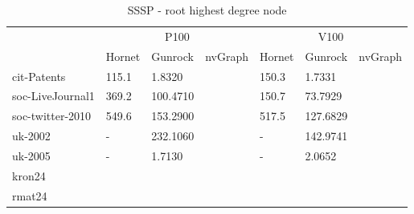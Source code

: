\begin{table}[t]
\begin{center}
\caption{SSSP - root highest degree node}
\begin{tabular}{l|l|l|l|l|l|l|}
\cline{2-7}
                                          & \multicolumn{3}{c|}{P100}  & \multicolumn{3}{c|}{V100}  \\ \cline{2-7} 
                                          & Hornet & Gunrock & nvGraph & Hornet & Gunrock & nvGraph \\ \hline
\multicolumn{1}{|l|}{cit-Patents}         &115.1&1.8320&         &150.3&1.7331&         \\ \hline %
\multicolumn{1}{|l|}{soc-LiveJournal1}    &369.2&100.4710&         &150.7&73.7929&         \\ \hline %
\multicolumn{1}{|l|}{soc-twitter-2010}    &549.6&153.2900&         &517.5&127.6829&         \\ \hline %
\multicolumn{1}{|l|}{uk-2002}             &-        &232.1060&         &-        &142.9741&         \\ \hline %
\multicolumn{1}{|l|}{uk-2005}             &-        &1.7130&         &-        &2.0652&         \\ \hline %
\multicolumn{1}{|l|}{kron24}              &        &         &         &        &         &         \\ \hline %
\multicolumn{1}{|l|}{rmat24}              &        &         &         &        &         &         \\ \hline %
\end{tabular}

\label{tab:graphs}
\end{center}
\end{table}